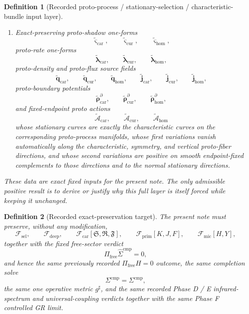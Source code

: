 \documentclass[11pt]{article}
\newcommand{\CompletedMetric}{g^{\sharp}}
\newcommand{\CompShift}{\Sigma^{\mathrm{cmp}}}
\newcommand{\CompLift}{\widehat\Sigma^{\mathrm{cmp}}}
\newcommand{\FreeProj}{\Pi_{\mathrm{free}}}
\newcommand{\GaugeAux}{Y}
\newcommand{\MicFunctional}{\mathscr F_{\mathrm{mic}}}
\newcommand{\PrimFunctional}{\mathscr F_{\mathrm{prim}}}
\newcommand{\CarrierFunctional}{\mathscr F_{\mathrm{car}}}
\newcommand{\DeepFunctional}{\mathscr F_{\mathrm{deep}}}
\newcommand{\StemFunctional}{\mathscr F_{\mathrm{sel}}}
\newcommand{\PrimStrain}{K}
\newcommand{\PrimNeutral}{J}
\newcommand{\PrimFree}{F}
\newcommand{\CarrierSeed}{\mathfrak S}
\newcommand{\RelabelSeed}{\mathfrak R}
\newcommand{\FreeSeed}{\mathfrak F}
\newcommand{\TensorProtoShadowForm}{\widetilde{\boldsymbol{\varsigma}}_{\mathrm{car}}}
\newcommand{\CurProtoShadowForm}{\widetilde{\boldsymbol{\varsigma}}_{\mathrm{cur}}}
\newcommand{\HomProtoShadowForm}{\widetilde{\boldsymbol{\varsigma}}_{\mathrm{hom}}}
\newcommand{\TensorProtoRateForm}{\widetilde{\boldsymbol{\lambda}}_{\mathrm{car}}}
\newcommand{\CurProtoRateForm}{\widetilde{\boldsymbol{\lambda}}_{\mathrm{cur}}}
\newcommand{\HomProtoRateForm}{\widetilde{\boldsymbol{\lambda}}_{\mathrm{hom}}}
\newcommand{\TensorProtoDensitySource}{\widetilde{\boldsymbol q}_{\mathrm{car}}}
\newcommand{\CurProtoDensitySource}{\widetilde{\boldsymbol q}_{\mathrm{cur}}}
\newcommand{\HomProtoDensitySource}{\widetilde{\boldsymbol q}_{\mathrm{hom}}}
\newcommand{\TensorProtoFluxSource}{\widetilde{\boldsymbol j}_{\mathrm{car}}}
\newcommand{\CurProtoFluxSource}{\widetilde{\boldsymbol j}_{\mathrm{cur}}}
\newcommand{\HomProtoFluxSource}{\widetilde{\boldsymbol j}_{\mathrm{hom}}}
\newcommand{\TensorProtoBoundarySource}{\widetilde{\boldsymbol{\rho}}_{\mathrm{car}}^{\partial}}
\newcommand{\CurProtoBoundarySource}{\widetilde{\boldsymbol{\rho}}_{\mathrm{cur}}^{\partial}}
\newcommand{\HomProtoBoundarySource}{\widetilde{\boldsymbol{\rho}}_{\mathrm{hom}}^{\partial}}
\newcommand{\TensorProtoAction}{\widetilde{\mathscr A}_{\mathrm{car}}}
\newcommand{\CurProtoAction}{\widetilde{\mathscr A}_{\mathrm{cur}}}
\newcommand{\HomProtoAction}{\widetilde{\mathscr A}_{\mathrm{hom}}}
\newtheorem{definition}{Definition}
\begin{document}
\begin{definition}[Recorded proto-process / stationary-selection / characteristic-bundle input layer]
\begin{enumerate}
    \item Exact-preserving proto-shadow one-forms
    \[
    \TensorProtoShadowForm,\qquad
    \CurProtoShadowForm,\qquad
    \HomProtoShadowForm,
    \]
    proto-rate one-forms
    \[
    \TensorProtoRateForm,\qquad
    \CurProtoRateForm,\qquad
    \HomProtoRateForm,
    \]
    proto-density and proto-flux source fields
    \[
    \TensorProtoDensitySource,\qquad
    \CurProtoDensitySource,\qquad
    \HomProtoDensitySource,\qquad
    \TensorProtoFluxSource,\qquad
    \CurProtoFluxSource,\qquad
    \HomProtoFluxSource,
    \]
    proto-boundary potentials
    \[
    \TensorProtoBoundarySource,\qquad
    \CurProtoBoundarySource,\qquad
    \HomProtoBoundarySource,
    \]
    and fixed-endpoint proto actions
    \[
    \TensorProtoAction,\qquad
    \CurProtoAction,\qquad
    \HomProtoAction
    \]
    whose stationary curves are exactly the characteristic curves on the corresponding proto-process manifolds, whose first variations vanish automatically along the characteristic, symmetry, and vertical proto-fiber directions, and whose second variations are positive on smooth endpoint-fixed complements to those directions and to the normal stationary directions.
\end{enumerate}
These data are exact fixed inputs for the present note. The only admissible positive result is to derive or justify why this full layer is itself forced while keeping it unchanged.
\end{definition}

\begin{definition}[Recorded exact-preservation target]
\label{def:recorded_target}
The present note must preserve, without any modification,
\begin{equation}
\StemFunctional,
\qquad
\DeepFunctional,
\qquad
\CarrierFunctional[\CarrierSeed,\RelabelSeed,\FreeSeed],
\qquad
\PrimFunctional[\PrimStrain,\PrimNeutral,\PrimFree],
\qquad
\MicFunctional[H,\GaugeAux],
\label{eq:target_functionals}
\end{equation}
together with the fixed free-sector verdict
\begin{equation}
\FreeProj\CompLift=0,
\label{eq:target_free}
\end{equation}
and hence the same previously recorded \(\Pi_{\mathrm{free}}H=0\) outcome, the same completion solve
\begin{equation}
\CompShift=\Sigma^{\mathrm{cmp}},
\label{eq:target_sigma}
\end{equation}
the same one operative metric \(\CompletedMetric\), and the same recorded Phase D / E infrared-spectrum and universal-coupling verdicts together with the same Phase F controlled GR limit.
\end{definition}
\end{document}
